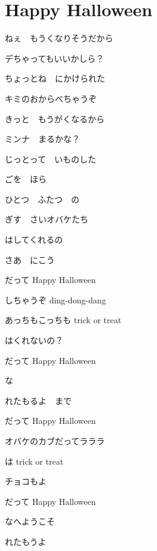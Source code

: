 \section{Happy Halloween}

ねぇ　もうくなりそうだから

デちゃってもいいかしら？

ちょっとね　にかけられた

キミのおからべちゃうぞ

\bigskip

きっと　もうがくなるから

ミンナ　まるかな？

じっとって　いものした

ごを　ほら

\bigskip

ひとつ　ふたつ　の

ぎす　さいオバケたち

はしてくれるの

さあ　にこう

\bigskip

だって Happy Halloween

しちゃうぞ ding-dong-dang

あっちもこっちも trick or treat

はくれないの？

だって Happy Halloween

な

れたもるよ　まで

\bigskip

だって Happy Halloween

オバケのカブだってラララ

は trick or treat

チョコもよ

だって Happy Halloween

なへようこそ

れたもうよ

